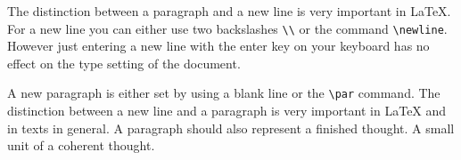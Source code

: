 \documentclass[10pt, a4paper]{article}
\begin{document}
\linespread{2}\selectfont
\blindtext

\linespread{1}\selectfont
The distinction between a paragraph and a new line is very important in \LaTeX. For a new line you can either use two backslashes \texttt{\textbackslash\textbackslash} or the command \verb+\newline+. However just entering a new line with the enter key on your keyboard has no effect on the type setting of the document.

A new paragraph is either set by using a blank line or the \verb+\par+ command. The distinction between a new line and a paragraph is very important in \LaTeX{} and in texts in general. A paragraph should also represent a finished thought. A small unit of a coherent thought.
\end{document}
